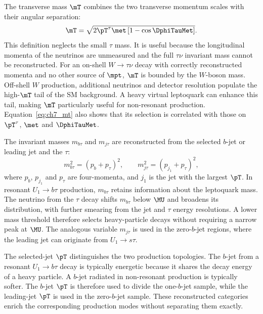 The transverse mass $\mT$ combines the two transverse momentum scales with their angular separation:
    \begin{equation}
        \mT = \sqrt{2\pT^\tau\met\left[1-\cos\DphiTauMet\right]}.
        \label{eq:ch7_mt}
    \end{equation}
    This definition neglects the small $\tau$ mass.
    It is useful because the longitudinal momenta of the neutrinos are unmeasured and the full $\tau\nu$ invariant mass cannot be reconstructed.
    For an on-shell $W\to\tau\nu$ decay with correctly reconstructed momenta and no other source of $\mpt$, $\mT$ is bounded by the $W$-boson mass.
    Off-shell $W$ production, additional neutrinos and detector resolution populate the high-$\mT$ tail of the SM background.
    A heavy virtual leptoquark can enhance this tail, making $\mT$ particularly useful for non-resonant production.
    Equation~\ref{eq:ch7_mt} also shows that its selection is correlated with those on $\pT^\tau$, $\met$ and $\DphiTauMet$.

The invariant masses $m_{b\tau}$ and $m_{j\tau}$ are reconstructed from the selected $b$-jet or leading jet and the $\tau$:
    \begin{equation}
        m_{b\tau}^{2} = (p_b+p_\tau)^2, \qquad m_{j\tau}^{2} = (p_{j_1}+p_\tau)^2,
        \label{eq:ch7_visible_masses}
    \end{equation}
    where $p_b$, $p_{j_1}$ and $p_\tau$ are four-momenta, and $j_1$ is the jet with the largest $\pT$.
    In resonant $U_1\to b\tau$ production, $m_{b\tau}$ retains information about the leptoquark mass.
    The neutrino from the $\tau$ decay shifts $m_{b\tau}$ below $\MU$ and broadens its distribution, with further smearing from the jet and $\tau$ energy resolutions.
    A lower mass threshold therefore selects heavy-particle decays without requiring a narrow peak at $\MU$.
    The analogous variable $m_{j\tau}$ is used in the zero-$b$-jet regions, where the leading jet can originate from $U_1\to s\tau$.

The selected-jet $\pT$ distinguishes the two production topologies.
    The $b$-jet from a resonant $U_1\to b\tau$ decay is typically energetic because it shares the decay energy of a heavy particle.
    A $b$-jet radiated in non-resonant production is typically softer.
    The $b$-jet $\pT$ is therefore used to divide the one-$b$-jet sample, while the leading-jet $\pT$ is used in the zero-$b$-jet sample.
    These reconstructed categories enrich the corresponding production modes without separating them exactly.

